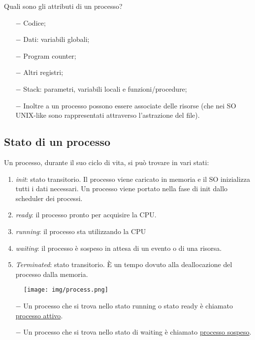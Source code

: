 \documentclass{article}
\begin{document}
Quali sono gli attributi di un processo? \begin{itemize}
    \item[$-$] Codice;
    \item[$-$] Dati: variabili globali;
    \item[$-$] Program counter;
    \item[$-$] Altri registri;
    \item[$-$] Stack: parametri, variabili locali e 
    funzioni/procedure;
    \item[$-$] Inoltre a un processo possono essere associate
     delle risorse (che nei SO UNIX-like sono rappresentati attraverso l'astrazione
     del file).
\end{itemize}

\subsection{Stato di un processo}
Un processo, durante il suo ciclo di vita, si può trovare
in vari stati:\begin{enumerate}
    \item \textit{init}: stato transitorio. Il processo viene
    caricato in memoria e il SO inizializza tutti i dati necessari.
    Un processo viene portato nella fase di init dallo scheduler dei processi.
    \item \textit{ready}: il processo pronto per acquisire la CPU.
    \item \textit{running}: il processo sta utilizzando la CPU
    \item \textit{waiting}: il processo è sospeso in attesa di un evento o di
    una risorsa.
    \item \textit{Terminated}: stato transitorio. È un tempo dovuto alla 
    deallocazione del processo dalla memoria.
\end{enumerate}
\begin{figure}[h!]
    \begin{center}
        \texttt{[image: img/process.png]}
    \end{center}
\end{figure}

\begin{itemize}
    \item[$-$] Un processo che si trova nello stato running o 
    stato ready è chiamato \underline{processo attivo}.
    \item[$-$]  Un processo che si trova nello
    stato di waiting è chiamato \underline{processo sospeso}.
\end{itemize}
\end{document}
